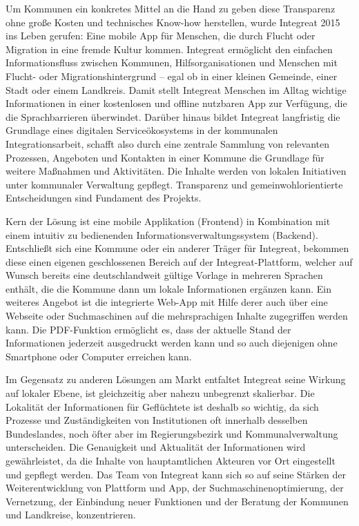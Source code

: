 \documentclass[12pt, a4paper]{article} %
\begin{document}
Um Kommunen ein konkretes Mittel an die Hand zu geben diese Transparenz
ohne große Kosten und technisches Know-how herstellen, wurde Integreat
2015 ins Leben gerufen: Eine mobile App für Menschen, die durch Flucht
oder Migration in eine fremde Kultur kommen. Integreat ermöglicht den
einfachen Informationsfluss zwischen Kommunen, Hilfsorganisationen und
Menschen mit Flucht- oder Migrationshintergrund – egal ob in einer
kleinen Gemeinde, einer Stadt oder einem Landkreis. Damit stellt
Integreat Menschen im Alltag wichtige Informationen in einer kostenlosen
und offline nutzbaren App zur Verfügung, die die Sprachbarrieren
überwindet. Darüber hinaus bildet Integreat langfristig die Grundlage
eines digitalen Serviceökosystems in der kommunalen Integrationsarbeit,
schafft also durch eine zentrale Sammlung von relevanten Prozessen,
Angeboten und Kontakten in einer Kommune die Grundlage für weitere
Maßnahmen und Aktivitäten. Die Inhalte werden von lokalen Initiativen
unter kommunaler Verwaltung gepflegt. Transparenz und
gemeinwohlorientierte Entscheidungen sind Fundament des Projekts.

Kern der Lösung ist eine mobile Applikation (Frontend) in Kombination
mit einem intuitiv zu bedienenden Informationsverwaltungssystem
(Backend). Entschließt sich eine Kommune oder ein anderer Träger für
Integreat, bekommen diese einen eigenen geschlossenen Bereich auf der
Integreat-Plattform, welcher auf Wunsch bereits eine deutschlandweit
gültige Vorlage in mehreren Sprachen enthält, die die Kommune dann um
lokale Informationen ergänzen kann. Ein weiteres Angebot ist die
integrierte Web-App mit Hilfe derer auch über eine Webseite oder
Suchmaschinen auf die mehrsprachigen Inhalte zugegriffen werden kann.
Die PDF-Funktion ermöglicht es, dass der aktuelle Stand der
Informationen jederzeit ausgedruckt werden kann und so auch diejenigen
ohne Smartphone oder Computer erreichen kann.

Im Gegensatz zu anderen Lösungen am Markt entfaltet Integreat seine
Wirkung auf lokaler Ebene, ist gleichzeitig aber nahezu unbegrenzt
skalierbar. Die Lokalität der Informationen für Geflüchtete ist deshalb
so wichtig, da sich Prozesse und Zuständigkeiten von Institutionen oft
innerhalb desselben Bundeslandes, noch öfter aber im Regierungsbezirk
und Kommunalverwaltung unterscheiden. Die Genauigkeit und Aktualität der
Informationen wird gewährleistet, da die Inhalte von hauptamtlichen
Akteuren vor Ort eingestellt und gepflegt werden. Das Team von Integreat
kann sich so auf seine Stärken der Weiterentwicklung von Plattform und
App, der Suchmaschinenoptimierung, der Vernetzung, der Einbindung neuer
Funktionen und der Beratung der Kommunen und Landkreise, konzentrieren.
\end{document}
